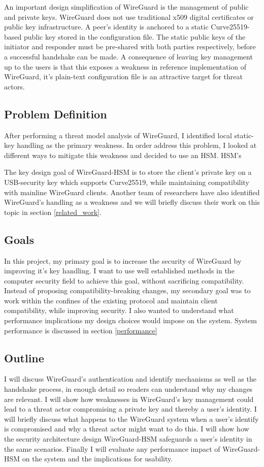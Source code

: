 \documentclass [11pt, proquest] {uwthesis}[2020/02/24]
\begin{document}
An important design simplification of WireGuard is the management of public and private keys. WireGuard does not use traditional x509 digital certificates or public key infrastructure. A peer's identity is anchored to a static Curve25519-based public key stored in the configuration file.
The static public keys of the initiator and responder must be pre-shared with both parties respectively, before a successful handshake can be made. 
A consequence of leaving key management up to the users is that this exposes a weakness in reference implementation of WireGuard, it's plain-text configuration file is an attractive target for threat actors.


\subsection{Problem Definition} \label{problem_definition}
After performing a threat model analysis of WireGuard, I identified local static-key handling as the primary weakness. In order address this problem, I looked at different ways to mitigate this weakness and decided to use an HSM. HSM's 


The key design goal of WireGuard-HSM is to store the client's private key on a USB-security key which supports Curve25519, while maintaining compatibility with mainline WireGuard clients. 
Another team of researchers have also identified WireGuard's handling as a weakness and we will briefly discuss their work on this topic in section \ref{related_work}.

\subsection{Goals}
In this project, my primary goal is to increase the security of WireGuard by improving it's key handling. I want to use well established methods in the computer security field to achieve this goal, without sacrificing compatibility. Instead of proposing compatibility-breaking changes, my secondary goal was to work within the confines of the existing protocol and maintain client compatibility, while improving security. I also wanted to understand what performance implications my design choices would impose on the system. System performance is discussed in section \ref{performance}

\subsection{Outline}
I will discuss WireGuard's authentication and identify mechanisms as well as the handshake process, in enough detail so readers can understand why my changes are relevant.
I will show how weaknesses in WireGuard's key management could lead to a threat actor compromising a private key and thereby a user's identity. 
I will briefly discuss what happens to the WireGuard system when a user's identify is compromised and why a threat actor might want to do this.
I will show how the security architecture design WireGuard-HSM safeguards a user's identity in the same scenarios.
Finally I will evaluate any performance impact of WireGuard-HSM on the system and the implications for usability.
\end{document}
